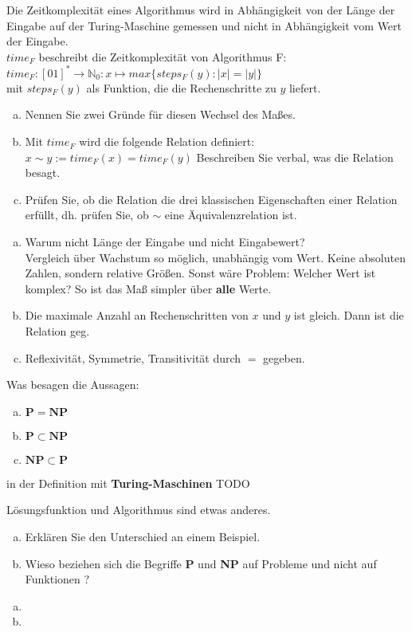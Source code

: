 \begin{card}
	Die Zeitkomplexität eines Algorithmus wird in Abhängigkeit von der Länge der Eingabe auf der Turing-Maschine gemessen und nicht in Abhängigkeit vom Wert der Eingabe.\\
	$time_F$ beschreibt die Zeitkomplexität von Algorithmus F:  $time_F:[01]^* \rightarrow \mathbb{N}_0 : x \mapsto max \{ steps_F(y):|x| = |y| \}$\\
	mit $steps_F(y)$ als Funktion, die die Rechenschritte zu $y$ liefert. 
	\begin{enumerate}[a)]
	\item Nennen Sie zwei Gründe für diesen Wechsel des Maßes. 
	\item Mit
	$time_F$ wird die folgende Relation definiert: 
	$x \sim y := time_F(x) = time_F(y)$
	Beschreiben Sie verbal, was die Relation besagt.
	\item Prüfen Sie, ob die Relation die drei klassischen Eigenschaften einer Relation erfüllt, dh. prüfen Sie, ob $\sim$ eine Äquivalenzrelation ist. 
	\end{enumerate}
	\hr
	\begin{enumerate}[a)]
	\item Warum nicht Länge der Eingabe und nicht Eingabewert?\\
	Vergleich über Wachstum so möglich, unabhängig vom Wert. Keine absoluten Zahlen, sondern relative Größen. Sonst wäre Problem: Welcher Wert ist komplex? So ist das Maß simpler über \textbf{alle} Werte.
	\item Die maximale Anzahl an Rechenschritten von $x$ und $y$ ist gleich. Dann ist die Relation geg.
	\item Reflexivität, Symmetrie, Transitivität durch $=$ gegeben.
	\end{enumerate}
\end{card}

\begin{card}
	Was besagen die Aussagen: 
	\begin{enumerate}[a)]
	\item $\mathbf{P = NP}$
	\item $\mathbf{P \subset NP}$
	\item $\mathbf{NP \subset P}$
	\end{enumerate}
	in der Definition mit \textbf{Turing-Maschinen} %
	\hr
	TODO
\end{card}

\begin{card}
	Lösungsfunktion und Algorithmus sind etwas anderes.
	\begin{enumerate}[a)]
	\item Erklären Sie den Unterschied an einem Beispiel.
	\item Wieso beziehen sich die Begriffe \textbf{P} und \textbf{NP} auf Probleme und nicht auf Funktionen ? 
	\end{enumerate}
	\hr
	\begin{enumerate}[a)]
	\item %
	\item 
	\end{enumerate}
\end{card}

